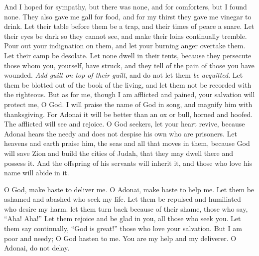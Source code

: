 \begin{biblechapter}
And I hoped for sympathy, but there was none, 
and for comforters, but I found none.
\verse They also gave me gall for food, 
and for my thirst they gave me vinegar to drink.
\verse Let their table before them be a trap, 
and their times of peace a snare.
\verse Let their eyes be dark so they cannot see, 
and make their loins continually tremble.
\verse Pour out your indignation on them, 
and let your burning anger overtake them.
\verse Let their camp be desolate. 
Let none dwell in their tents,
\verse because they persecute those whom you, yourself, have struck, 
and they tell of the pain of those you have wounded.
\verse \textit{Add guilt on top of their guilt}, 
and do not let them \textit{be acquitted}.
\verse Let them be blotted out of the book of the living, 
and let them not be recorded with the righteous.
\verse But as for me, though I am afflicted and pained, 
your salvation will protect me, O God.
\verse I will praise the name of God in song, 
and magnify him with thanksgiving.
\verse For Adonai it will be better than an ox or bull, 
horned and hoofed.
\verse The afflicted will see and rejoice. 
O God seekers, let your heart revive,
\verse because Adonai hears the needy 
and does not despise his own who are prisoners.
\verse Let heavens and earth praise him, 
the seas and all that moves in them,
\verse because God will save Zion 
and build the cities of Judah, 
that they may dwell there and possess it.
\verse And the offspring of his servants will inherit it, 
and those who love his name will abide in it.
\end{biblechapter}

\begin{biblechapter} %
 O God, make haste to deliver me. 
O Adonai, make haste to help me.
\verse Let them be ashamed and abashed 
who seek my life. 
Let them be repulsed and humiliated 
who desire my harm.
\verse let them turn back because of their shame, 
those who say, “Aha! Aha!”
\verse Let them rejoice and be glad in you, 
all those who seek you. 
Let them say continually, “God is great!” 
those who love your salvation.
\verse But I am poor and needy; 
O God hasten to me. 
You are my help and my deliverer. 
O Adonai, do not delay.
\end{biblechapter}

